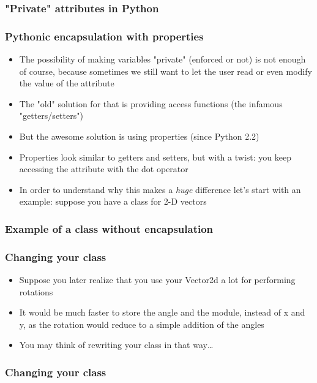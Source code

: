 \documentclass[9pt]{beamer}
\begin{document}
\begin{frame}
  \frametitle{"Private" attributes in Python}
  
\end{frame}


\begin{frame}
  \frametitle{Pythonic encapsulation with properties}
  
  \begin{itemize}
    \item The possibility of making variables "private" (enforced or not) is not enough of course,
          because sometimes we still want to let the user read or even modify the value of the attribute
    \medskip
    \item The "old" solution for that is providing access functions (the infamous "getters/setters")
    \medskip
    \item But the awesome solution is using \alert{properties} (since Python 2.2)
    \medskip
    \item Properties look similar to getters and setters, but with a twist: you keep
          accessing the attribute with the dot operator
    \medskip
    \item In order to understand why this makes a \emph{huge} difference let's 
          start with an example: suppose you have a class for 2-D vectors
  \end{itemize}
  
\end{frame}

\begin{frame}
  \frametitle{Example of a class without encapsulation}
  
\end{frame}


\begin{frame}
  \frametitle{Changing your class}
  \begin{itemize}
    \item Suppose you later realize that you use your Vector2d a lot for performing rotations
    \medskip
    \item It would be much faster to store the angle and the module, instead of x and y,
          as the rotation would reduce to a simple addition of the angles
    \medskip
    \item You may think of rewriting your class in that way\dots
  \end{itemize}
\end{frame}


\begin{frame}
  \frametitle{Changing your class}
  
\end{frame}
\end{document}
